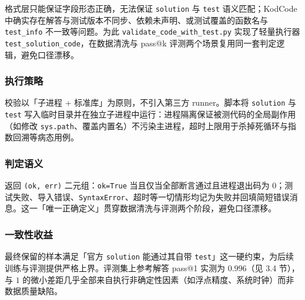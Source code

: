 
格式层只能保证字段形态正确，无法保证 \texttt{solution} 与 \texttt{test} 语义匹配；KodCode 中确实存在解答与测试版本不同步、依赖未声明、或测试覆盖的函数名与 \texttt{test\_info} 不一致等问题。为此 \texttt{validate\_code\_with\_test.py} 实现了轻量执行器 \texttt{test\_solution\_code}，在数据清洗与 pass@k 评测两个场景复用同一套判定逻辑，避免口径漂移。

\subsubsection{执行策略}
校验以「子进程 + 标准库」为原则，不引入第三方 runner。脚本将 \texttt{solution} 与 \texttt{test} 写入临时目录并在独立子进程中运行：进程隔离保证被测代码的全局副作用（如修改 \texttt{sys.path}、覆盖内置名）不污染主进程，超时上限用于杀掉死循环与指数回溯等病态用例。

\subsubsection{判定语义}
返回 \texttt{(ok, err)} 二元组：\texttt{ok=True} 当且仅当全部断言通过且进程退出码为 $0$；测试失败、导入错误、\texttt{SyntaxError}、超时等一切情形均记为失败并回填简短错误消息。这一「唯一正确定义」贯穿数据清洗与评测两个阶段，避免口径漂移。

\subsubsection{一致性收益}
最终保留的样本满足「官方 \texttt{solution} 能通过其自带 \texttt{test}」这一硬约束，为后续训练与评测提供严格上界。评测集上参考解答 pass@1 实测为 $0.996$（见 3.4 节），与 $1$ 的微小差距几乎全部来自执行非确定性因素（如浮点精度、系统时钟）而非数据质量缺陷。